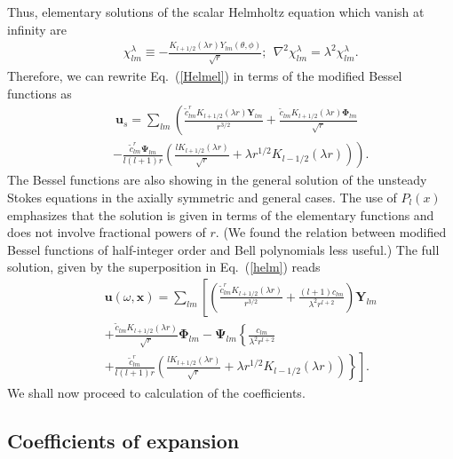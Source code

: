 \documentclass[aps,prx,twocolumn,amsmath,amssymb,amsfonts]{revtex4-2}
\begin{document}
Thus, elementary solutions of the scalar Helmholtz equation which vanish at infinity are
\begin{eqnarray}&&\!\!\!\!\!\!\!\!\!\!\!\!
\chi^{\lambda}_{lm}\equiv -\frac{ K_{l+1/2}(\lambda r)Y_{lm}(\theta, \phi)}{\sqrt{r}};\ \ \nabla^2\chi^{\lambda}_{lm}=\lambda^2\chi^{\lambda}_{lm}.
\label{ek}
\end{eqnarray}
Therefore, we can rewrite Eq.~(\ref{Helmel}) in terms of the modified Bessel functions as
\begin{eqnarray}&&\
\bm u_s\!=\!\sum_{lm} \left(\frac{{\tilde c}^{r}_{lm} K_{l+1/2}(\lambda r)\bm Y_{lm}}{r^{3/2}}+\frac{{\tilde c}_{lm} K_{l+1/2}(\lambda r)\bm \Phi_{lm}}{\sqrt{r}}
\right.\nonumber\\&&\left.
-\frac{{\tilde c}^{r}_{lm} \bm \Psi_{lm}}{l(l+1)r}\left(\frac{l K_{l+1/2}(\lambda r)}{\sqrt{r}}
\!+\!\lambda r^{1/2}K_{l-1/2}(\lambda r)\right)\right). \label{helmh}
\end{eqnarray}
The Bessel functions are also showing in the general solution of the unsteady Stokes equations in the axially symmetric \cite{rao} and general \cite{pad} cases. The use of $P_l(x)$ emphasizes that the solution
is given in terms of the elementary functions and does not involve fractional powers of $r$. (We found the relation between modified Bessel functions of half-integer order and Bell polynomials \cite{na} less useful.) The full solution, given by the superposition in Eq.~(\ref{helm}) reads
\begin{eqnarray}&&\!\!\!\!\!\!\!\!\!\!\!\!
\bm u(\omega, \bm x)\!=\!\sum_{lm}\left[\left(\frac{{\tilde c}^{r}_{lm} K_{l+1/2}(\lambda r)}{r^{3/2}}+\frac{(l+1)c_{lm}}{\lambda^2 r^{l+2}}\right)\bm Y_{lm}
\right.\nonumber\\&&\!\!\!\!\!\!\!\!\!\!\!\!\left.
+\frac{{\tilde c}_{lm} K_{l+1/2}(\lambda r)}{\sqrt{r}}\bm \Phi_{lm}-\!\bm \Psi_{lm}\left\{\frac{c_{lm}}{\lambda^2 r^{l+2}}
\right.\right.\nonumber\\&&\!\!\!\!\!\!\!\!\!\!\!\!\left.\left.
+\frac{{\tilde c}^{r}_{lm} }{l(l+1)r}\left(\frac{l K_{l+1/2}(\lambda r)}{\sqrt{r}}
\!+\!\lambda r^{1/2}K_{l-1/2}(\lambda r)\right)\right\}\right]. \label{ho}
\end{eqnarray}
We shall now proceed to calculation of the coefficients.



\subsection{Coefficients of expansion} \label{sdj}
\end{document}

